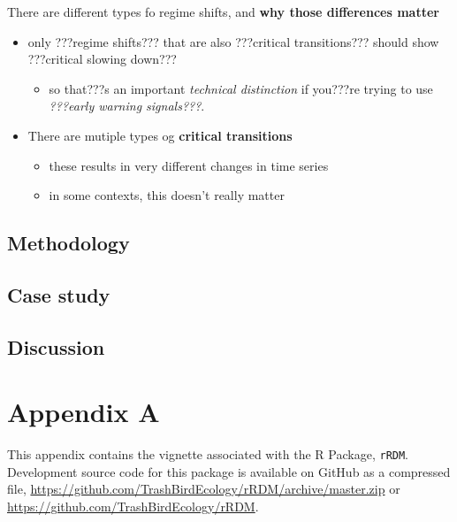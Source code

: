 \documentclass[12pt,twoside,openany]{reedthesis}
\providecommand{\tightlist}{%
  \setlength{\itemsep}{0pt}\setlength{\parskip}{0pt}}
\begin{document}
There are different types fo regime shifts, and \textbf{why those differences matter}
\begin{itemize}
\tightlist
\item
  only ???regime shifts??? that are also ???critical transitions??? should show ???critical slowing down???
  \begin{itemize}
  \tightlist
  \item
    so that???s an important \emph{technical distinction} if you???re trying to use \emph{???early warning signals???}.\\
  \end{itemize}
\item
  There are mutiple types og \textbf{critical transitions}
  \begin{itemize}
  \tightlist
  \item
    these results in very different changes in time series\\
  \item
    in some contexts, this doesn't really matter
  \end{itemize}
\end{itemize}
\hypertarget{methodology}{%
\section{Methodology}\label{methodology}}

\hypertarget{case-study-1}{%
\section{Case study}\label{case-study-1}}

\hypertarget{discussion-2}{%
\section{Discussion}\label{discussion-2}}

\appendix

\hypertarget{rRDM}{%
\chapter*{Appendix A}\label{rRDM}}

This appendix contains the vignette associated with the R Package, \texttt{rRDM}. Development source code for this package is available on GitHub as a compressed file, \url{https://github.com/TrashBirdEcology/rRDM/archive/master.zip} or \url{https://github.com/TrashBirdEcology/rRDM}.
\end{document}
